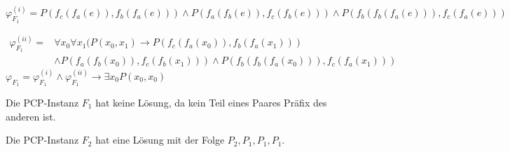 \documentclass[12pt,a4paper]{scrartcl}
\begin{document}
  $\varphi_{F_1}^{(i)} = P(f_c(f_a(e)), f_b(f_a(e))) \wedge
  P(f_a(f_b(e)), f_c(f_b(e))) \wedge
  P(f_b(f_b(f_a(e))), f_c(f_a(e)))$
  
  \begin{align*}
    \varphi_{F_1}^{(ii)} =& \forall x_0 \forall x_1 (P(x_0, x_1) \rightarrow
    P(f_c(f_a(x_0)), f_b(f_a(x_1)))\\ &\wedge
    P(f_a(f_b(x_0)), f_c(f_b(x_1))) \wedge
    P(f_b(f_b(f_a(x_0))), f_c(f_a(x_1)))
  \end{align*}
  $\varphi_{F_1} = \varphi_{F_1}^{(i)} \wedge \varphi_{F_1}^{(ii)} \rightarrow
  \exists x_0 P(x_0, x_0)$
  
  Die PCP-Instanz $F_1$ hat keine Lösung, da kein Teil eines Paares Präfix des anderen ist. 
  
  Die PCP-Instanz $F_2$ hat eine Lösung mit der Folge $P_2, P_1, P_1, P_1$.
  
\end{document}
